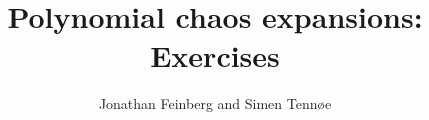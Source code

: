 \documentclass[handout]{beamer}
\title{Polynomial chaos expansions: Exercises}
\author{Jonathan Feinberg and Simen Tennøe}
\begin{document}
\begin{frame}
  \maketitle
\end{frame}


%  
%    
%  
%   

\end{document}
